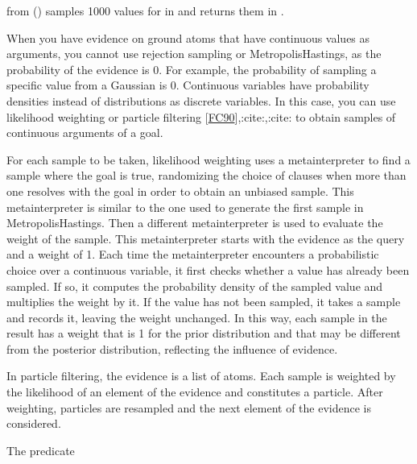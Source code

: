 \documentclass[letterpaper,10pt,english]{sphinxmanual}
\begin{document}
\sphinxAtStartPar
from () samples 1000 values for  in  and returns them in .

\sphinxAtStartPar
When you have evidence on ground atoms that have continuous values as arguments, you cannot use rejection sampling or Metropolis\sphinxhyphen{}Hastings, as the probability of the evidence is 0. For example, the probability of sampling a specific value from a Gaussian is 0.
Continuous variables have probability densities instead of distributions as discrete variables. In this case, you can use likelihood weighting or particle filtering {[}\hyperlink{cite.index:id61}{FC90}{]},:cite:,:cite: to obtain samples of continuous arguments of a goal.

\sphinxAtStartPar
For each sample to be taken, likelihood weighting uses a meta\sphinxhyphen{}interpreter to find a sample where the goal is true, randomizing the choice of clauses when more than one resolves with the goal in order to obtain an unbiased sample.
This meta\sphinxhyphen{}interpreter is similar to the one used to generate the first sample in Metropolis\sphinxhyphen{}Hastings.
Then a different meta\sphinxhyphen{}interpreter is used to evaluate the weight of the sample.
This meta\sphinxhyphen{}interpreter starts with the evidence as the query and a weight of 1.
Each time the meta\sphinxhyphen{}interpreter encounters a probabilistic choice over a continuous variable, it first checks whether a value has already been sampled.
If so, it computes the probability density of the sampled value and multiplies the weight by it.
If the value has not been sampled, it takes a sample and records it, leaving the weight unchanged.
In this way, each sample in the result has a weight that is 1 for the prior distribution and that may be different from the posterior distribution, reflecting the influence of evidence.

\sphinxAtStartPar
In particle filtering, the evidence is a list of atoms. Each sample is weighted by the likelihood of an element of the evidence and constitutes a particle.
After weighting, particles are resampled and the next element of the evidence is considered.

\sphinxAtStartPar
The predicate

\begin{sphinxVerbatim}[commandchars=\\\{\}]
  
\end{sphinxVerbatim}
\end{document}
